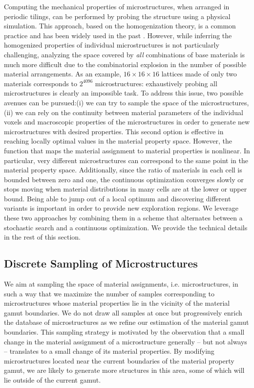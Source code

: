 Computing the mechanical properties of microstructures, when arranged in periodic tilings, can be performed by probing the structure using a physical simulation. This approach, based on the homogenization theory, is a common practice and has been widely used in the past \cite{Allaire2012,Schumacher:2015,Panetta:2015}. However, while inferring the homogenized properties of individual microstructures is not particularly challenging, analyzing the space covered by {\it all} combinations of base materials is much more difficult due to the combinatorial explosion in the number of possible material arrangements. As an example, $16\times16\times16$ lattices made of only two materials  corresponds to $2^{4096}$ microstructures: exhaustively probing all microstructures is clearly an impossible task.
To address this issue, two possible avenues can be pursued:(i) we can try to sample the space of the microstructures, (ii) we can rely on the continuity between material parameters of the individual voxels and macroscopic properties of the microstructures in order to generate new microstructures with desired properties. This second option is effective in reaching locally optimal values in the material property space. However, the function that maps the material assignment to material properties is nonlinear. In particular, very different microstructures can correspond to the same point in the material property space. Additionally, since the ratio of materials in each cell is bounded between zero and one, the continuous optimization converges slowly or stops moving when material distributions in many cells are at the lower or upper bound. Being able to jump out of a local optimum and discovering different variants is important in order to provide new exploration regions. We leverage these two approaches by combining them in a scheme that alternates between a stochastic search and a continuous optimization. We provide the technical details in the rest of this section.

\subsection{Discrete Sampling of Microstructures}
We aim at sampling the space of material assignments, i.e. microstructures, in such a way that we maximize the number of samples corresponding to microstructures whose material properties lie in the vicinity of the material gamut boundaries. We do not draw all samples at once but progressively enrich the database of microstructures as we refine our estimation of the material gamut boundaries. This sampling strategy is motivated by the observation that a small change in the material assignment of a microstructure generally -- but not always -- translates to a small change of its material properties. By modifying microstructures located near the current boundaries of the material property gamut, we are likely to generate more structures in this area, some of which will lie outside of the current gamut.

